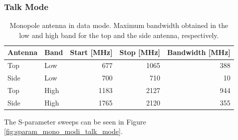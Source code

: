 \FloatBarrier
\subsubsection{Talk Mode}
\begin{table}[htbp]
  \centering
  \begin{tabular}{|l|l|r|r|r|}
    \hline
    Antenna & Band & Start [MHz] & Stop [MHz] & Bandwidth [MHz] \\
    \hline
    Top     & Low  &  677  & 1065  & 388 \\
    Side    & Low  &  700  & 710  & 10  \\
    \hline
    Top     & High &  1183 &  2127  & 944 \\
    Side    & High & 1765 &  2120 & 355 \\
    \hline
  \end{tabular}
  \caption{Monopole antenna in data mode. Maximum bandwidth obtained in the low and high band for the top and the side antenna, respectively.}    
  \label{tab:bw_mono_modi_tm}
\end{table}

The S-parameter sweeps can be seen in Figure \ref{fig:sparam_mono_modi_talk_mode}.


